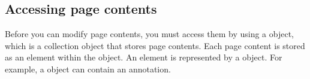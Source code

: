\documentclass[letterpaper,12pt,english,openany,oneside]{sphinxmanual}
\begin{document}
\begin{sphinxVerbatim}[commandchars=\\\{\}]
   
   
  

     
   

    
   
   
\end{sphinxVerbatim}


\subsection{Accessing page contents}
\label{\detokenize{Plugins_Pages:accessing-page-contents}}
Before you can modify page contents, you must access them by using a  object, which is a collection object that stores page contents. Each page content is stored as an element within the  object. An element is represented by a  object. For example, a  object can contain an annotation.
\end{document}
